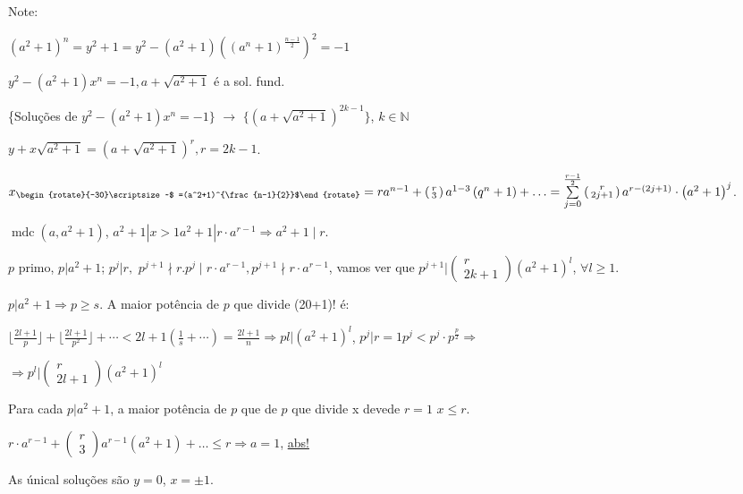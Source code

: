 \documentclass[a4paper,12pt]{article}
\renewcommand{\leq}{\ensuremath{\leqslant}}
\renewcommand{\geq}{\ensuremath{\geqslant}}
\theoremstyle{plain} %
\theoremstyle{definition} %
\theoremstyle{remark} %
\newcommand{\rotsup}[1]{\begin{rotate}{-30}\scriptsize ~#1\end{rotate}}%
\begin{document}
\begin{framed}
		Note:
		
		$\left(a^{2}+1\right)^{n}=y^{2}+1=y^{2}-\left(a^{2}+1\right)\left(\left(a^{n}+1\right)^{\frac{n-1}{2}}\right)^{2}=-1$
		
		\begin{center}
			$y^{2}-\left(a^{2}+1\right) x^{n}=-1, a+\sqrt{a^{2}+1}$ \'e a sol. fund.
		\end{center}
		
		\{Solu\c{c}\~oes de $y^{2}-\left(a^{2}+1\right) x^{n}=-1\}$ $\rightarrow$ $\{(a+\sqrt{a^{2}+1})^{2k-1}\}$, $k\in \mathds{N}$
		
		$y+x \sqrt{a^{2}+1}=\left(a+\sqrt{a^{2}+1}\right)^{r}, r=2k-1$.
		
		$x_{\rotsup{$ =(a^2+1)^{\frac{n-1}{2}}$}}=r a^{n-1}+\left(\begin{smallmatrix} r \\ 3\end{smallmatrix}\right) a^{1-3}\left(q^{n}+1\right)+\ldots=\sum\limits_{j=0}^{\frac{r-1}{2}}\left(\begin{smallmatrix} r \\ 2j+1\end{smallmatrix}\right) a^{r-(2j+1)} \cdot\left(a^{2}+1\right)^{j}$.
		
		\vspace{2em}
		
		$\operatorname{mdc} (a, a^2+1)$, $a^{2}+1\left|x>1 a^{2}+1\right| r \cdot a^{r-1} \Rightarrow a^{2}+1 \mid r$.
		
		$p$ primo, $p|a^{2}+1$; $p^{j}| r,$ $p^{j+1} \nmid r . p^{j} \mid r \cdot a^{r-1}, p^{j+1} \nmid r \cdot a^{r-1}$, vamos ver que $p^{j+1}|\left(\begin{smallmatrix} r \\ 2k+1\end{smallmatrix}\right)(a^2+1)^l$, $\forall l\geq 1$.
		
		$p|a^{2}+1\Rightarrow p\geq s$. A maior pot\^encia de $p$ que divide (20+1)! \'e:
		
		$\lfloor \frac{2l+1}{p}\rfloor + \lfloor \frac{2l+1}{p^2}\rfloor + \cdots < 2l+1 (\frac{1}{s} + \cdots)=\frac{2l+1}{n}\Rightarrow pl|(a^2+1)^l$, $p^j|r=1 p^j<p^j\cdot p^{\frac{p}{2}}\Rightarrow$
		
		$\Rightarrow p^l|\left(\begin{smallmatrix} r \\ 2l+1\end{smallmatrix}\right)(a^2+1)^l$
		
		Para cada $p|a^{2}+1$, a maior pot\^encia de $p$ que de $p$ que divide x devede $r=1$ $x\leq r$.
		
		$r\cdot a^{r-1}+\left(\begin{smallmatrix} r \\ 3 \end{smallmatrix}\right) a^{r-1}(a^2+1)+\dotso \leq r\Rightarrow a=1$, \underline{abs!}
		
		As \'unical solu\c{c}\~oes s\~ao $y=0$, $x=\pm 1$.
		
	\end{framed}
	
\end{document}
